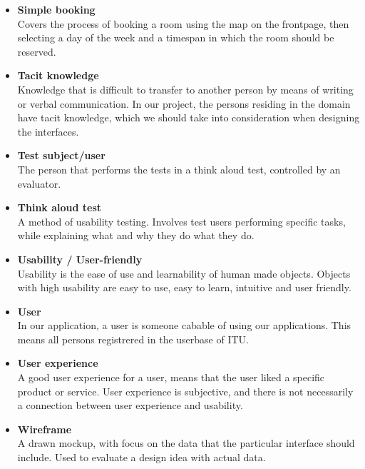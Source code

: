 \begin{itemize}
\item \textbf{Simple booking}\\
Covers the process of booking a room using the map on the frontpage, then selecting a day of the week and a timespan in which the room should be reserved.

\item \textbf{Tacit knowledge}\\
Knowledge that is difficult to transfer to another person by means of writing or verbal communication. In our project, the persons residing in the domain have tacit knowledge, which we should take into consideration when designing the interfaces.

\item \textbf{Test subject/user}\\
The person that performs the tests in a think aloud test, controlled by an evaluator. 

\item \textbf{Think aloud test}\\
A method of usability testing. Involves test users performing specific tasks, while explaining what and why they do what they do.

\item \textbf{Usability / User-friendly}\\
Usability is the ease of use and learnability of human made objects. Objects with high usability are easy to use, easy to learn, intuitive and user friendly.

\item \textbf{User}\\
In our application, a user is someone cabable of using our applications. This means all persons registrered in the userbase of ITU.

\item \textbf{User experience}\\
A good user experience for a user, means that the user liked a specific product or service. User experience is subjective, and there is not necessarily a connection between user experience and usability.

\item \textbf{Wireframe}\\
A drawn mockup, with focus on the data that the particular interface should include. Used to evaluate a design idea with actual data.

\end{itemize}